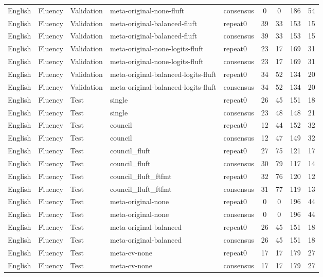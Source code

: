 \begin{tabular}{lllllcccc}
English & Fluency & Validation & meta-original-none-fluft & consensus & 0 & 0 & 186 & 54 \\
English & Fluency & Validation & meta-original-balanced-fluft & repeat0 & 39 & 33 & 153 & 15 \\
English & Fluency & Validation & meta-original-balanced-fluft & consensus & 39 & 33 & 153 & 15 \\
English & Fluency & Validation & meta-original-none-logits-fluft & repeat0 & 23 & 17 & 169 & 31 \\
English & Fluency & Validation & meta-original-none-logits-fluft & consensus & 23 & 17 & 169 & 31 \\
English & Fluency & Validation & meta-original-balanced-logits-fluft & repeat0 & 34 & 52 & 134 & 20 \\
English & Fluency & Validation & meta-original-balanced-logits-fluft & consensus & 34 & 52 & 134 & 20 \\
English & Fluency & Test & single & repeat0 & 26 & 45 & 151 & 18 \\
English & Fluency & Test & single & consensus & 23 & 48 & 148 & 21 \\
English & Fluency & Test & council & repeat0 & 12 & 44 & 152 & 32 \\
English & Fluency & Test & council & consensus & 12 & 47 & 149 & 32 \\
English & Fluency & Test & council\_fluft & repeat0 & 27 & 75 & 121 & 17 \\
English & Fluency & Test & council\_fluft & consensus & 30 & 79 & 117 & 14 \\
English & Fluency & Test & council\_fluft\_ftfmt & repeat0 & 32 & 76 & 120 & 12 \\
English & Fluency & Test & council\_fluft\_ftfmt & consensus & 31 & 77 & 119 & 13 \\
English & Fluency & Test & meta-original-none & repeat0 & 0 & 0 & 196 & 44 \\
English & Fluency & Test & meta-original-none & consensus & 0 & 0 & 196 & 44 \\
English & Fluency & Test & meta-original-balanced & repeat0 & 26 & 45 & 151 & 18 \\
English & Fluency & Test & meta-original-balanced & consensus & 26 & 45 & 151 & 18 \\
English & Fluency & Test & meta-cv-none & repeat0 & 17 & 17 & 179 & 27 \\
English & Fluency & Test & meta-cv-none & consensus & 17 & 17 & 179 & 27 \\

\end{tabular}
